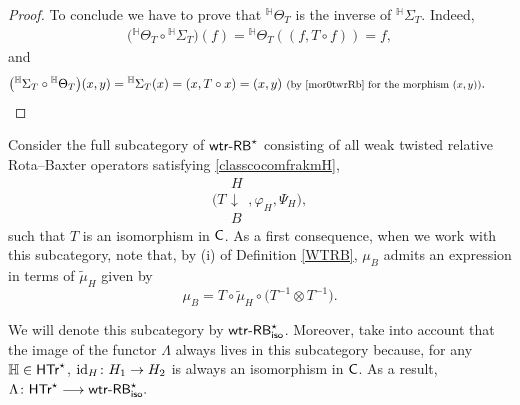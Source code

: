 \documentclass[10pt,a4paper]{amsart}
\numberwithin{equation}{section}
\begin{document}
\begin{proof}
To conclude we have to prove that ${}^{\mathbb{H}}\Theta_{T}$ is the inverse of ${}^{\mathbb{H}}\Sigma_{T}$. Indeed,
\begin{align*}
\bigl({}^{\mathbb{H}}\Theta_{T}\circ {}^{\mathbb{H}}\Sigma_{T}\bigr)(f)={}^{\mathbb{H}}\Theta_{T}((f, T\circ f))=f,
\end{align*}
and
\begin{align*}
\bigl({}^{\mathbb{H}}\Sigma_{T}\circ{}^{\mathbb{H}}\Theta_{T}\bigr)(x,y)={}^{\mathbb{H}}\Sigma_{T}(x)=(x,T\circ x)=(x,y)\ \text{\footnotesize\textnormal{(by \eqref{mor0twrRb} for the morphism $(x,y)$)}}.
\tag*{\qed}
\end{align*}
\renewcommand{\qed}{}
\end{proof}

Consider the full subcategory of ${\sf wtr}\textnormal{-}{\sf RB}^{\star}$ consisting of all weak twisted relative Rota--Baxter operators satisfying \eqref{classcocomfrakmH},
\[
\Biggl(T\begin{array}{c}H\\\downarrow\\B\end{array},\varphi_{H},\Psi_{H}\biggr),
\]
 such that $T$ is an isomorphism in ${\sf C}$. As a first consequence, when we work with this subcategory, note that, by (i) of Definition \ref{WTRB}, $\mu_{B}$ admits an expression in terms of $\widetilde{\mu}_{H}$ given by
\begin{equation*}%
\mu_{B}=T\circ \widetilde{\mu}_{H}\circ\bigl(T^{-1}\otimes T^{-1}\bigr).
\end{equation*}

We will denote this subcategory by ${\sf wtr}\textnormal{-}{\sf RB}^{\star}_{{\sf iso}}$. Moreover, take into account that the image of the functor $\Lambda$ always lives in this subcategory because, for any $\mathbb{H}\in {\sf HTr}^{\star}$, ${\rm id}_{H}\colon H_{1}\rightarrow H_{2}$ is always an isomorphism in ${\sf C}$. As a result,
$\Lambda\colon \sf{HTr}^{\star}\longrightarrow {\sf wtr}\textnormal{-}{\sf RB}^{\star}_{{\sf iso}}.$
\end{document}
